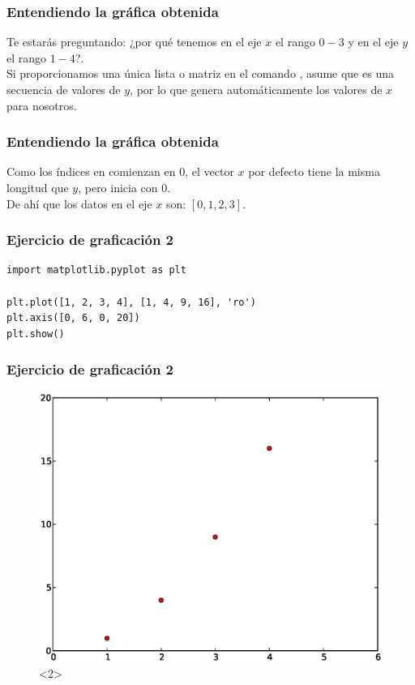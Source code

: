 \documentclass[12pt]{beamer}
\begin{document}
\begin{frame}
\frametitle{Entendiendo la gráfica obtenida}
Te estarás preguntando: ¿por qué tenemos en el eje $x$ el rango $0-3$ y en el eje $y$ el rango  $1-4$?.
\\
\medskip
\pause
Si proporcionamos una única lista o matriz en el comando ,  asume que es una secuencia de valores de $y$, \pause por lo que genera automáticamente los valores de $x$ para nosotros.
\end{frame}
\begin{frame}
\frametitle{Entendiendo la gráfica obtenida}
Como los índices en \python{} comienzan en $0$, el vector $x$ por defecto tiene la misma longitud que $y$, pero inicia con $0$.
\\
\bigskip
\pause
De ahí que los datos en el eje $x$ son: $[0, 1, 2, 3]$.
\end{frame}
\begin{frame}[fragile]
\frametitle{Ejercicio de graficación 2}
\begin{lstlisting}[caption=Graficando dos listas]
import matplotlib.pyplot as plt

plt.plot([1, 2, 3, 4], [1, 4, 9, 16], 'ro')
plt.axis([0, 6, 0, 20])
plt.show()
\end{lstlisting}
\end{frame}
\begin{frame}[fragile]
\frametitle{Ejercicio de graficación 2}
\begin{figure}
	\centering
	\includegraphics[scale=0.475]{Imagenes/plotEjercicio2.eps}<2> 
\end{figure}
\end{frame}
\end{document}
